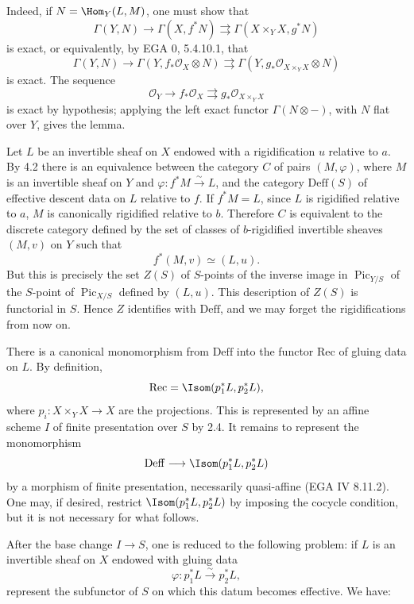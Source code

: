 \documentclass[11pt]{article}
\providecommand{\Pic}{\operatorname{Pic}}
\begin{document}
Indeed, if \(N=\Hom_Y(L,M)\), one must show that
\[
  \Gamma(Y,N)\longrightarrow \Gamma(X,f^*N)
  \rightrightarrows
  \Gamma(X\times_YX,g^*N)
\]
is exact, or equivalently, by EGA 0, 5.4.10.1, that
\[
  \Gamma(Y,N)\longrightarrow \Gamma(Y,f_*\mathcal O_X\otimes N)
  \rightrightarrows
  \Gamma(Y,g_*\mathcal O_{X\times_YX}\otimes N)
\]
is exact. The sequence
\[
  \mathcal O_Y\longrightarrow f_*\mathcal O_X
  \rightrightarrows g_*\mathcal O_{X\times_YX}
\]
is exact by hypothesis; applying the left exact functor \(\Gamma(N\otimes -)\), with \(N\) flat over \(Y\), gives the lemma.

Let \(L\) be an invertible sheaf on \(X\) endowed with a rigidification \(u\) relative to \(a\). By 4.2 there is an equivalence between the category \(C\) of pairs \((M,\varphi)\), where \(M\) is an invertible sheaf on \(Y\) and \(\varphi:f^*M\xrightarrow{\sim}L\), and the category \(\mathrm{Deff}(S)\) of effective descent data on \(L\) relative to \(f\). If \(f^*M=L\), since \(L\) is rigidified relative to \(a\), \(M\) is canonically rigidified relative to \(b\). Therefore \(C\) is equivalent to the discrete category defined by the set of classes of \(b\)-rigidified invertible sheaves \((M,v)\) on \(Y\) such that
\[
  f^*(M,v)\simeq (L,u).
\]
But this is precisely the set \(Z(S)\) of \(S\)-points of the inverse image in \(\Pic_{Y/S}\) of the \(S\)-point of \(\Pic_{X/S}\) defined by \((L,u)\). This description of \(Z(S)\) is functorial in \(S\). Hence \(Z\) identifies with \(\mathrm{Deff}\), and we may forget the rigidifications from now on.

There is a canonical monomorphism from \(\mathrm{Deff}\) into the functor \(\mathrm{Rec}\) of gluing data on \(L\). By definition,
\[
  \mathrm{Rec}=\Isom(p_1^*L,p_2^*L),
\]
where \(p_i:X\times_YX\to X\) are the projections. This is represented by an affine scheme \(I\) of finite presentation over \(S\) by 2.4. It remains to represent the monomorphism
\[
  \mathrm{Deff}\longrightarrow \Isom(p_1^*L,p_2^*L)
\]
by a morphism of finite presentation, necessarily quasi-affine (EGA IV 8.11.2). One may, if desired, restrict \(\Isom(p_1^*L,p_2^*L)\) by imposing the cocycle condition, but it is not necessary for what follows.

After the base change \(I\to S\), one is reduced to the following problem: if \(L\) is an invertible sheaf on \(X\) endowed with gluing data
\[
  \varphi:p_1^*L\xrightarrow{\sim}p_2^*L,
\]
represent the subfunctor of \(S\) on which this datum becomes effective. We have:
\end{document}
